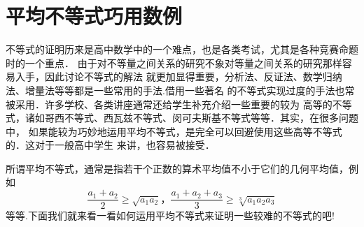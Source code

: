 \documentclass[a4paper]{ctexart}
\begin{document}
    \section*{平均不等式巧用数例}
    \begin{center}
        { }
    \end{center} 

    不等式的证明历来是高中数学中的一个难点，也是各类考试，尤其是各种竞赛命题时的一个重点．
    由于对不等量之间关系的研究不象对等量之间关系的研究那样容易入手，因此讨论不等式的解法
    就更加显得重要，分析法、反证法、数学归纳法、增量法等等都是一些常用的手法.借用一些著名
    的不等式实现过度的手法也常被采用．许多学校、各类讲座通常还给学生补充介绍一些重要的较为
    高等的不等式，诸如哥西不等式、西瓦兹不等式、闵可夫斯基不等式等等．其实，在很多问题中，
    如果能较为巧妙地运用平均不等式，是完全可以回避使用这些高等不等式的．这对于一般高中学生
    来讲，也容易被接受．\par \vspace{1ex}
    所谓平均不等式，通常是指若干个正数的算术平均值不小于它们的几何平均值，例如
    \[\frac{a_1+a_2}{2}\geqslant \sqrt{a_1 a_2}，
    \frac{a_1+a_2+a_3}{3}\geqslant \sqrt[3]{a_1 a_2 a_3}\]
    等等.下面我们就来看一看如何运用平均不等式来证明一些较难的不等式的吧!
    \newenvironment{LiTi}{\begin{list}{\heiti 例 \arabic{liti}．}{\usecounter{liti}%
            \labelsep=1ex
            \itemindent = 4.32em
            \listparindent = \parindent
            \leftmargin = 0cm
            \rightmargin = 0cm
            \itemsep=0cm
        }}{\end{list}}
\end{document}
